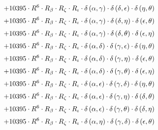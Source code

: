 \begin{subequations}
\begin{gather}
 \\[0.2em] \notag 		 + 10395 \cdot R^{6} \cdot R_{\beta{}} \cdot R_{\zeta{}} \cdot R_{\iota{}} \cdot \delta{}\left(\alpha{}, \gamma{}\right) \cdot \delta{}\left(\delta{}, \epsilon{}\right) \cdot \delta{}\left(\eta{}, \theta{}\right) 
 \\[0.2em] \notag 		 + 10395 \cdot R^{6} \cdot R_{\beta{}} \cdot R_{\zeta{}} \cdot R_{\iota{}} \cdot \delta{}\left(\alpha{}, \gamma{}\right) \cdot \delta{}\left(\delta{}, \eta{}\right) \cdot \delta{}\left(\epsilon{}, \theta{}\right) 
 \\[0.2em] \notag 		 + 10395 \cdot R^{6} \cdot R_{\beta{}} \cdot R_{\zeta{}} \cdot R_{\iota{}} \cdot \delta{}\left(\alpha{}, \gamma{}\right) \cdot \delta{}\left(\delta{}, \theta{}\right) \cdot \delta{}\left(\epsilon{}, \eta{}\right) 
 \\[0.2em] \notag 		 + 10395 \cdot R^{6} \cdot R_{\beta{}} \cdot R_{\zeta{}} \cdot R_{\iota{}} \cdot \delta{}\left(\alpha{}, \delta{}\right) \cdot \delta{}\left(\gamma{}, \epsilon{}\right) \cdot \delta{}\left(\eta{}, \theta{}\right) 
 \\[0.2em] \notag 		 + 10395 \cdot R^{6} \cdot R_{\beta{}} \cdot R_{\zeta{}} \cdot R_{\iota{}} \cdot \delta{}\left(\alpha{}, \delta{}\right) \cdot \delta{}\left(\gamma{}, \eta{}\right) \cdot \delta{}\left(\epsilon{}, \theta{}\right) 
 \\[0.2em] \notag 		 + 10395 \cdot R^{6} \cdot R_{\beta{}} \cdot R_{\zeta{}} \cdot R_{\iota{}} \cdot \delta{}\left(\alpha{}, \delta{}\right) \cdot \delta{}\left(\gamma{}, \theta{}\right) \cdot \delta{}\left(\epsilon{}, \eta{}\right) 
 \\[0.2em] \notag 		 + 10395 \cdot R^{6} \cdot R_{\beta{}} \cdot R_{\zeta{}} \cdot R_{\iota{}} \cdot \delta{}\left(\alpha{}, \epsilon{}\right) \cdot \delta{}\left(\gamma{}, \delta{}\right) \cdot \delta{}\left(\eta{}, \theta{}\right) 
 \\[0.2em] \notag 		 + 10395 \cdot R^{6} \cdot R_{\beta{}} \cdot R_{\zeta{}} \cdot R_{\iota{}} \cdot \delta{}\left(\alpha{}, \epsilon{}\right) \cdot \delta{}\left(\gamma{}, \eta{}\right) \cdot \delta{}\left(\delta{}, \theta{}\right) 
 \\[0.2em] \notag 		 + 10395 \cdot R^{6} \cdot R_{\beta{}} \cdot R_{\zeta{}} \cdot R_{\iota{}} \cdot \delta{}\left(\alpha{}, \epsilon{}\right) \cdot \delta{}\left(\gamma{}, \theta{}\right) \cdot \delta{}\left(\delta{}, \eta{}\right) 
 \\[0.2em] \notag 		 + 10395 \cdot R^{6} \cdot R_{\beta{}} \cdot R_{\zeta{}} \cdot R_{\iota{}} \cdot \delta{}\left(\alpha{}, \eta{}\right) \cdot \delta{}\left(\gamma{}, \delta{}\right) \cdot \delta{}\left(\epsilon{}, \theta{}\right) 

\end{gather}
\end{subequations}
